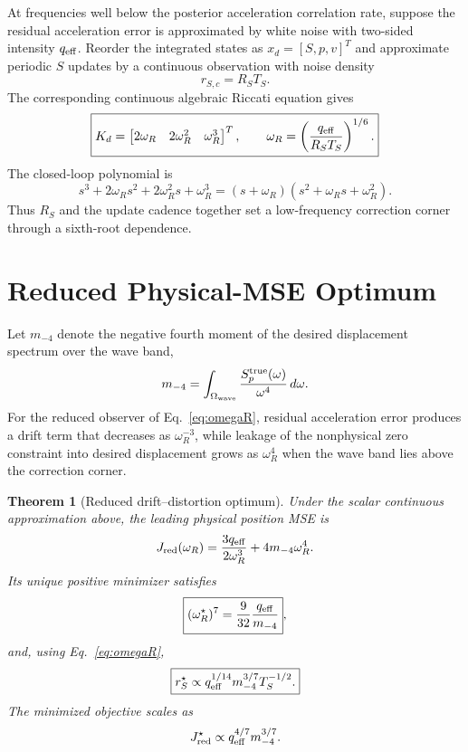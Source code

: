 \documentclass[conference]{IEEEtran}
\newtheorem{theorem}{Theorem}
\theoremstyle{remark}
\begin{document}
At frequencies well below the posterior acceleration correlation rate, suppose
the residual acceleration error is approximated by white noise with two-sided
intensity $q_{\rm eff}$.  Reorder the integrated states as
$x_d=[S,p,v]^T$ and approximate periodic $S$ updates by a continuous
observation with noise density
\begin{equation}
 r_{S,c}=R_ST_S.
 \label{eq:rsc}
\end{equation}
The corresponding continuous algebraic Riccati equation gives
\begin{equation}
 \boxed{
 K_d=\begin{bmatrix}2\omega_R&2\omega_R^2&\omega_R^3\end{bmatrix}^{T},
 \qquad
 \omega_R=\left(\frac{q_{\rm eff}}{R_ST_S}\right)^{1/6}.}
 \label{eq:omegaR}
\end{equation}
The closed-loop polynomial is
\begin{equation}
 s^3+2\omega_Rs^2+2\omega_R^2s+\omega_R^3
 =(s+\omega_R)(s^2+\omega_Rs+\omega_R^2).
 \label{eq:poles}
\end{equation}
Thus $R_S$ and the update cadence together set a low-frequency correction
corner through a sixth-root dependence.

\section{Reduced Physical-MSE Optimum}
\label{sec:reduced-mse}

Let $m_{-4}$ denote the negative fourth moment of the desired displacement
spectrum over the wave band,
\begin{equation}
 m_{-4}=\int_{\Omega_{\rm wave}}
 \frac{S_p^{\rm true}(\omega)}{\omega^4}\,d\omega.
 \label{eq:m4}
\end{equation}
For the reduced observer of Eq.~\eqref{eq:omegaR}, residual acceleration error
produces a drift term that decreases as $\omega_R^{-3}$, while leakage of the
nonphysical zero constraint into desired displacement grows as
$\omega_R^4$ when the wave band lies above the correction corner.

\begin{theorem}[Reduced drift--distortion optimum]
\label{thm:reduced-mse}
Under the scalar continuous approximation above, the leading physical position
MSE is
\begin{equation}
 J_{\rm red}(\omega_R)
 =\frac{3q_{\rm eff}}{2\omega_R^3}
 +4m_{-4}\omega_R^4.
 \label{eq:Jred}
\end{equation}
Its unique positive minimizer satisfies
\begin{equation}
 \boxed{(\omega_R^\star)^7
 =\frac{9}{32}\frac{q_{\rm eff}}{m_{-4}}},
 \label{eq:wopt}
\end{equation}
and, using Eq.~\eqref{eq:omegaR},
\begin{equation}
 \boxed{r_S^\star\propto
 q_{\rm eff}^{1/14}m_{-4}^{3/7}T_S^{-1/2}.}
 \label{eq:rsopt}
\end{equation}
The minimized objective scales as
\begin{equation}
 J_{\rm red}^\star\propto q_{\rm eff}^{4/7}m_{-4}^{3/7}.
 \label{eq:jopt-scaling}
\end{equation}
\end{theorem}
\end{document}
